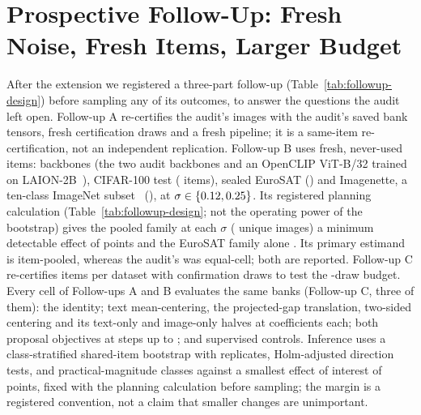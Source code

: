 
\section{Prospective Follow-Up: Fresh Noise, Fresh Items, Larger Budget}
\label{sec:followup}

After the extension we registered a three-part follow-up
(Table~\ref{tab:followup-design}) before sampling any
of its outcomes, to answer the questions the audit left open. Follow-up A
re-certifies the audit's \FUImagesA{} images with the
audit's saved bank tensors, fresh certification draws and a fresh pipeline; it
is a same-item re-certification, not an independent replication. Follow-up B
uses fresh, never-used items: \FUBackbonesB{} backbones (the two
audit backbones and an OpenCLIP ViT-B/32 trained on
LAION-2B~\cite{schuhmann2022laion5b,cherti2023openclip}), CIFAR-100 test
(\FUItemsCifarB{} items), sealed EuroSAT (\FUItemsEurosatB{}) and Imagenette,
a ten-class ImageNet subset~\cite{howard2019imagenette} (\FUItemsImagenetteB{}), at
$\sigma\in\{0.12,0.25\}$. Its registered planning calculation
(Table~\ref{tab:followup-design}; not the operating power of the bootstrap)
gives the pooled family at each $\sigma$ (\FUImagesB{} unique images) a minimum
detectable effect of \FUPooledMDE{} points and the EuroSAT family alone \FUEurosatMDE{}. Its primary
estimand is item-pooled, whereas the audit's was equal-cell; both are reported.
Follow-up C re-certifies \FUItemsC{} items per dataset with \FUBudgetDraws{}
confirmation draws to test the \FUConfDraws{}-draw budget. Every cell of
Follow-ups A and B evaluates the same \FUBanks{} banks (Follow-up C, three of them):
the identity; text mean-centering, the projected-gap translation, two-sided
centering and its text-only and image-only halves at \FUCoefficients{}
coefficients each; both proposal objectives at \FUSteps{} steps up
to \FUStepMax{}; and \FUControls{} supervised controls. Inference uses a
class-stratified shared-item bootstrap with \FUReplicates{} replicates,
Holm-adjusted direction tests, and practical-magnitude classes against a
smallest effect of interest of \FUSESOI{} points, fixed with the planning
calculation before sampling; the margin is a registered convention, not a
claim that smaller changes are unimportant.

